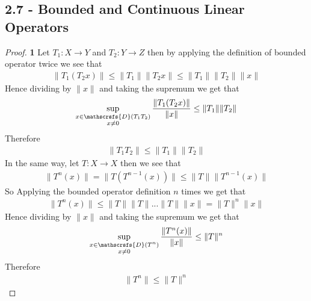 \documentclass[11pt]{article}
\newcommand{\dom}{\mathscrsfs{D}}
\theoremstyle{definition}
\begin{document}
\subsection*{2.7 - Bounded and Continuous Linear Operators}
\begin{proof}{\textbf{1}}
Let $T_1:X \to Y$ and $T_2: Y \to Z$ then by applying the definition of
bounded operator twice we see that
\begin{align*}
    \|T_1(T_2x)\|\leq \|T_1\|\|T_2x\| \leq \|T_1\|\|T_2\|\|x\|
\end{align*}
Hence dividing by $\|x\|$ and taking the supremum we get that
\begin{align*}
    \sup_{
        \substack{x \in \dom(T_1T_2)\\ x \neq 0}}\frac{\|T_1(T_2x)\|}{\|x\|}
    \leq \|T_1\|\|T_2\|
\end{align*}
Therefore
\begin{align*}
    \|T_1T_2\| \leq \|T_1\|\|T_2\|
\end{align*}
In the same way, let $T:X \to X$ then we see that
\begin{align*}
    \|T^n(x)\| = \|T(T^{n-1}(x))\|\leq \|T\|\|T^{n-1}(x)\|
\end{align*}
So Applying the bounded operator definition $n$ times we get that
\begin{align*}
    \|T^n(x)\| \leq \|T\|\|T\| ... \|T\|\|x\| = \|T\|^n\|x\|
\end{align*}
Hence dividing by $\|x\|$ and taking the supremum we get that
\begin{align*}
    \sup_{
        \substack{x \in \dom(T^n)\\ x \neq 0}}\frac{\|T^n(x)\|}{\|x\|}
    \leq \|T\|^n
\end{align*}
Therefore
\begin{align*}
    \|T^n\| \leq \|T\|^n
\end{align*}
\end{proof}
\cleardoublepage
\end{document}
